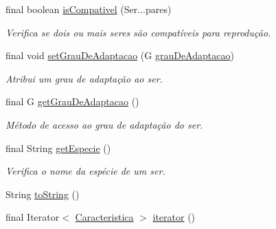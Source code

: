 \begin{DoxyCompactItemize}
final boolean \hyperlink{classic_1_1populacional_1_1_ser_3_01_g_01extends_01_number_01_4_a96ed425cf79095bd16eb8a2d4d6c5518}{is\-Compativel} (Ser...\-pares)
\begin{DoxyCompactList}\small\item\em Verifica se dois ou mais seres são compatíveis para reprodução. \end{DoxyCompactList}\item 
final void \hyperlink{classic_1_1populacional_1_1_ser_3_01_g_01extends_01_number_01_4_a5036977cafc000afc734273613500b9e}{set\-Grau\-De\-Adaptacao} (G \hyperlink{classic_1_1populacional_1_1_ser_3_01_g_01extends_01_number_01_4_aba308e4d1affe1f03d74adb5257d269c}{grau\-De\-Adaptacao})
\begin{DoxyCompactList}\small\item\em Atribui um grau de adaptação ao ser. \end{DoxyCompactList}\item 
final G \hyperlink{classic_1_1populacional_1_1_ser_3_01_g_01extends_01_number_01_4_acd958f02df4d8f84eeb43632b3ed3411}{get\-Grau\-De\-Adaptacao} ()
\begin{DoxyCompactList}\small\item\em Método de acesso ao grau de adaptação do ser. \end{DoxyCompactList}\item 
final String \hyperlink{classic_1_1populacional_1_1_ser_3_01_g_01extends_01_number_01_4_a7becc40306adcb55e03cebe969123818}{get\-Especie} ()
\begin{DoxyCompactList}\small\item\em Verifica o nome da espécie de um ser. \end{DoxyCompactList}\item 
String \hyperlink{classic_1_1populacional_1_1_ser_3_01_g_01extends_01_number_01_4_aad249a20074d8283f82ae96675fa6677}{to\-String} ()
\item 
final Iterator$<$ \hyperlink{interfaceic_1_1populacional_1_1_caracteristica}{Caracteristica} $>$ \hyperlink{classic_1_1populacional_1_1_ser_3_01_g_01extends_01_number_01_4_acc3e8056e7b5418f28a4e0effa1246d3}{iterator} ()
\end{DoxyCompactItemize}
